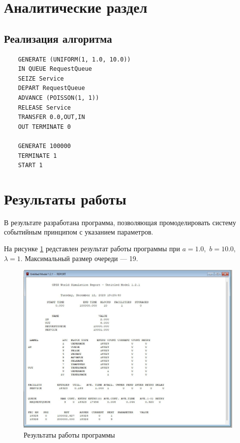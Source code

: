 \section{Аналитические раздел}


\subsection{Реализация алгоритма}

\begin{lstlisting}
	GENERATE (UNIFORM(1, 1.0, 10.0))
	IN QUEUE RequestQueue
	SEIZE Service
	DEPART RequestQueue
	ADVANCE (POISSON(1, 1))
	RELEASE Service
	TRANSFER 0.0,OUT,IN 
	OUT TERMINATE 0
	
	GENERATE 100000
	TERMINATE 1
	START 1	
\end{lstlisting}

\section{Результаты работы}

В результате разработана программа, позволяющая промоделировать
систему событийным принципом с указанием параметров.

На рисунке \ref{fig:r2} редставлен результат работы программы при $a=1.0$, $b = 10.0$, $\lambda=1$. Максимальный размер очереди --- 19.

\begin{figure}[ht!]
	\includegraphics[width=0.75\linewidth]{assets/images/res.png}
	\caption{Результаты работы программы}
	\label{fig:r2}
\end{figure}